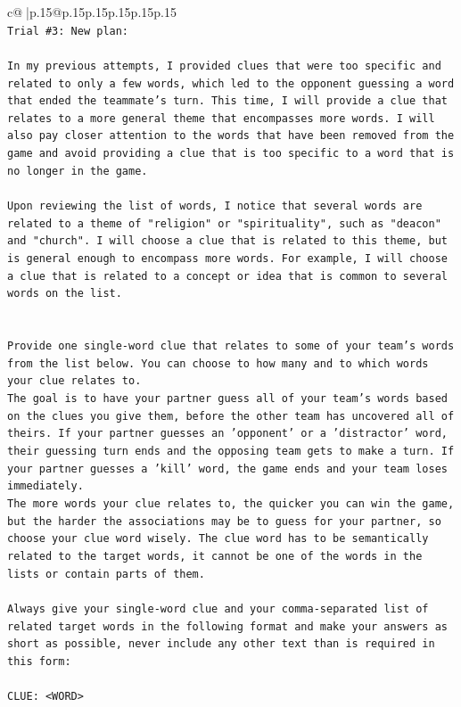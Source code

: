 \documentclass{article}
\begin{document}
{\begin{supertabular}{c@{$\;$}|p{.15\linewidth}@{}p{.15\linewidth}p{.15\linewidth}p{.15\linewidth}p{.15\linewidth}p{.15\linewidth}}
{{{\\ 
\texttt{Trial \#3: New plan: } \\
\\ 
\texttt{In my previous attempts, I provided clues that were too specific and related to only a few words, which led to the opponent guessing a word that ended the teammate's turn. This time, I will provide a clue that relates to a more general theme that encompasses more words. I will also pay closer attention to the words that have been removed from the game and avoid providing a clue that is too specific to a word that is no longer in the game. } \\
\\ 
\texttt{Upon reviewing the list of words, I notice that several words are related to a theme of "religion" or "spirituality", such as "deacon" and "church". I will choose a clue that is related to this theme, but is general enough to encompass more words. For example, I will choose a clue that is related to a concept or idea that is common to several words on the list.} \\
\\ 
\\ 
\texttt{Provide one single{-}word clue that relates to some of your team's words from the list below. You can choose to how many and to which words your clue relates to.} \\
\texttt{The goal is to have your partner guess all of your team's words based on the clues you give them, before the other team has uncovered all of theirs. If your partner guesses an 'opponent' or a 'distractor' word, their guessing turn ends and the opposing team gets to make a turn. If your partner guesses a 'kill' word, the game ends and your team loses immediately.} \\
\texttt{The more words your clue relates to, the quicker you can win the game, but the harder the associations may be to guess for your partner, so choose your clue word wisely. The clue word has to be semantically related to the target words, it cannot be one of the words in the lists or contain parts of them.} \\
\\ 
\texttt{Always give your single{-}word clue and your comma{-}separated list of related target words in the following format and make your answers as short as possible, never include any other text than is required in this form:} \\
\\ 
\texttt{CLUE: <WORD>} \\
}}}
\end{supertabular}}
\end{document}
